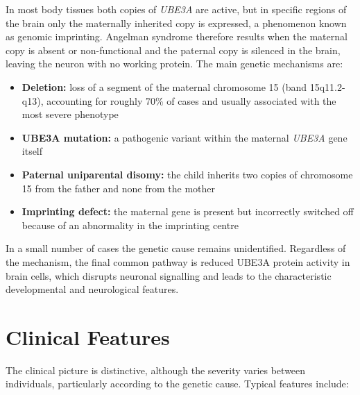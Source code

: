 In most body tissues both copies of \textit{UBE3A} are active, but in specific regions of the brain only the maternally inherited copy is expressed, a phenomenon known as genomic imprinting. Angelman syndrome therefore results when the maternal copy is absent or non-functional and the paternal copy is silenced in the brain, leaving the neuron with no working protein. The main genetic mechanisms are:

\begin{itemize}
    \item \textbf{Deletion:} loss of a segment of the maternal chromosome 15 (band 15q11.2-q13), accounting for roughly 70\% of cases and usually associated with the most severe phenotype
    \item \textbf{UBE3A mutation:} a pathogenic variant within the maternal \textit{UBE3A} gene itself
    \item \textbf{Paternal uniparental disomy:} the child inherits two copies of chromosome 15 from the father and none from the mother
    \item \textbf{Imprinting defect:} the maternal gene is present but incorrectly switched off because of an abnormality in the imprinting centre
\end{itemize}

In a small number of cases the genetic cause remains unidentified. Regardless of the mechanism, the final common pathway is reduced UBE3A protein activity in brain cells, which disrupts neuronal signalling and leads to the characteristic developmental and neurological features.

\section*{Clinical Features}
The clinical picture is distinctive, although the severity varies between individuals, particularly according to the genetic cause. Typical features include:

